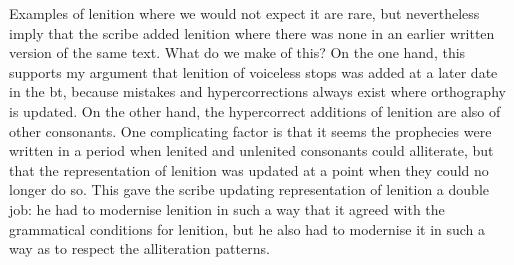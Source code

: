 Examples of lenition where we would not expect it are rare, but nevertheless imply that the scribe added lenition where there was none in an earlier written version of the same text. What do we make of this? On the one hand, this supports my argument that lenition of voiceless stops was added at a later date in the \gls{bt}, because mistakes and hypercorrections always  exist where orthography is updated. On the other hand, the hypercorrect additions of lenition are  also of other consonants. One complicating factor is that it seems the prophecies were written in a period when lenited and unlenited consonants could alliterate, but that the representation of lenition was updated at a point when they could no longer do so. This gave the scribe updating representation of lenition a double job: he had to modernise lenition in such a way that it agreed with the grammatical conditions for lenition, but he also had to modernise it in such a way as to respect the alliteration patterns. 



